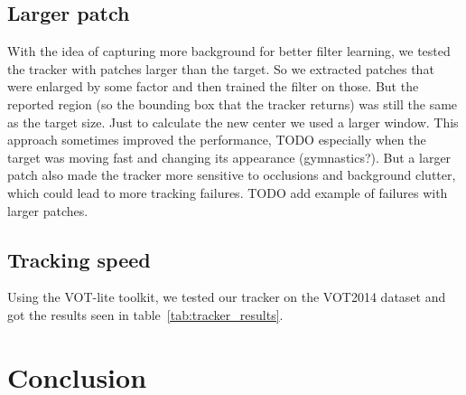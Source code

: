 \documentclass[9pt]{IEEEtran}
\begin{document}
\subsection{Larger patch}
With the idea of capturing more background for better filter learning, we tested the tracker with patches larger than the target.
So we extracted patches that were enlarged by some factor and then trained the filter on those. But the reported region (so the bounding box that the tracker returns) was
still the same as the target size. Just to calculate the new center we used a larger window. This approach sometimes improved the performance,
TODO especially when the target was moving fast and changing its appearance (gymnastics?). But a larger patch
also made the tracker more sensitive to occlusions and background clutter, which could lead to more tracking failures. 
TODO add example of failures with larger patches. 






\subsection{Tracking speed}
Using the VOT-lite toolkit, we tested our tracker on the VOT2014 dataset and got the results seen in table~\ref{tab:tracker_results}.


\begin{table}[h!]
    \centering
    \caption{Tracker results on the VOT2014 dataset.}\label{tab:tracker_results}
\end{table}


\section{Conclusion}





\end{document}
